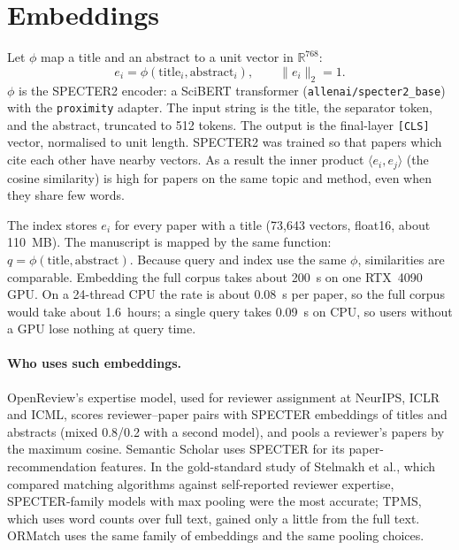\documentclass[11pt]{article}
\newcommand{\Rset}{\mathbb{R}}
\begin{document}
\section{Embeddings}
Let $\phi$ map a title and an abstract to a unit vector in $\Rset^{768}$:
\[
  e_i = \phi(\text{title}_i, \text{abstract}_i), \qquad \|e_i\|_2 = 1 .
\]
$\phi$ is the SPECTER2 encoder: a SciBERT transformer (\texttt{allenai/specter2\_base}) with the \texttt{proximity} adapter. The input string is the title, the separator token, and the abstract, truncated to 512 tokens. The output is the final-layer \texttt{[CLS]} vector, normalised to unit length. SPECTER2 was trained so that papers which cite each other have nearby vectors. As a result the inner product $\langle e_i, e_j\rangle$ (the cosine similarity) is high for papers on the same topic and method, even when they share few words.

The index stores $e_i$ for every paper with a title (73{,}643 vectors, float16, about 110~MB). The manuscript is mapped by the same function: $q = \phi(\text{title}, \text{abstract})$. Because query and index use the same $\phi$, similarities are comparable. Embedding the full corpus takes about 200~s on one RTX~4090 GPU. On a 24-thread CPU the rate is about 0.08~s per paper, so the full corpus would take about 1.6~hours; a single query takes 0.09~s on CPU, so users without a GPU lose nothing at query time.

\paragraph{Who uses such embeddings.} OpenReview's expertise model, used for reviewer assignment at NeurIPS, ICLR and ICML, scores reviewer--paper pairs with SPECTER embeddings of titles and abstracts (mixed 0.8/0.2 with a second model), and pools a reviewer's papers by the maximum cosine. Semantic Scholar uses SPECTER for its paper-recommendation features. In the gold-standard study of Stelmakh et al., which compared matching algorithms against self-reported reviewer expertise, SPECTER-family models with max pooling were the most accurate; TPMS, which uses word counts over full text, gained only a little from the full text. ORMatch uses the same family of embeddings and the same pooling choices.
\end{document}
